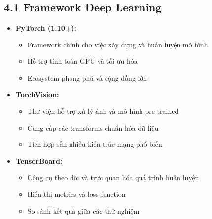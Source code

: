 \documentclass[12pt]{report}
\begin{document}
\subsection*{4.1 Framework Deep Learning}
\begin{itemize}
    \item \textbf{PyTorch (1.10+):}
        \begin{itemize}
            \item Framework chính cho việc xây dựng và huấn luyện mô hình
            \item Hỗ trợ tính toán GPU và tối ưu hóa
            \item Ecosystem phong phú và cộng đồng lớn
        \end{itemize}
    \item \textbf{TorchVision:}
        \begin{itemize}
            \item Thư viện hỗ trợ xử lý ảnh và mô hình pre-trained
            \item Cung cấp các transforms chuẩn hóa dữ liệu
            \item Tích hợp sẵn nhiều kiến trúc mạng phổ biến
        \end{itemize}
    \item \textbf{TensorBoard:}
        \begin{itemize}
            \item Công cụ theo dõi và trực quan hóa quá trình huấn luyện
            \item Hiển thị metrics và loss function
            \item So sánh kết quả giữa các thử nghiệm
        \end{itemize}
\end{itemize}
\end{document}
